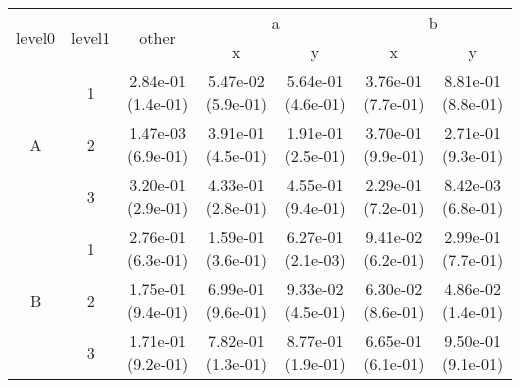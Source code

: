 \begin{tabular}{ccccccc}
\toprule
\multirow{2}{*}{level0} & \multirow{2}{*}{level1}& \multirow{2}{*}{other}&\multicolumn{2}{c}{a}&\multicolumn{2}{c}{b}\tabularnewline
\cmidrule(lr){4-5}
\cmidrule(lr){6-7}
&&&x&y&x&y\tabularnewline
\midrule
\multirow{3}{*}{A}&1& 2.84e-01 (1.4e-01)& 5.47e-02 (5.9e-01)& 5.64e-01 (4.6e-01)& 3.76e-01 (7.7e-01)& 8.81e-01 (8.8e-01)\tabularnewline
&2& 1.47e-03 (6.9e-01)& 3.91e-01 (4.5e-01)& 1.91e-01 (2.5e-01)& 3.70e-01 (9.9e-01)& 2.71e-01 (9.3e-01)\tabularnewline
&3& 3.20e-01 (2.9e-01)& 4.33e-01 (2.8e-01)& 4.55e-01 (9.4e-01)& 2.29e-01 (7.2e-01)& 8.42e-03 (6.8e-01)\tabularnewline
\midrule
\multirow{3}{*}{B}&1& 2.76e-01 (6.3e-01)& 1.59e-01 (3.6e-01)& 6.27e-01 (2.1e-03)& 9.41e-02 (6.2e-01)& 2.99e-01 (7.7e-01)\tabularnewline
&2& 1.75e-01 (9.4e-01)& 6.99e-01 (9.6e-01)& 9.33e-02 (4.5e-01)& 6.30e-02 (8.6e-01)& 4.86e-02 (1.4e-01)\tabularnewline
&3& 1.71e-01 (9.2e-01)& 7.82e-01 (1.3e-01)& 8.77e-01 (1.9e-01)& 6.65e-01 (6.1e-01)& 9.50e-01 (9.1e-01)\tabularnewline
\bottomrule
\end{tabular}
